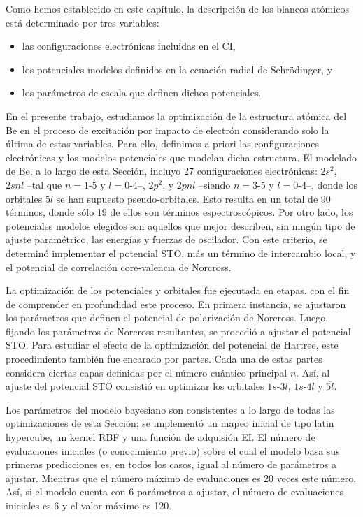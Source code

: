 Como hemos establecido en este capítulo, la descripción de los blancos 
atómicos está determinado por tres variables:
\begin{itemize}
\item las configuraciones electrónicas incluidas en el CI,
\item los potenciales modelos definidos en la ecuación radial de 
Schr\"odinger, y
\item los parámetros de escala que definen dichos potenciales.
\end{itemize}
En el presente trabajo, estudiamos la optimización de la estructura 
atómica del Be en el proceso de excitación por impacto de electrón 
considerando solo la última de estas variables. Para ello, definimos a 
priori las configuraciones electrónicas y los modelos potenciales que
modelan dicha estructura. El modelado de Be, a lo largo de esta Sección,
incluyo 27 configuraciones electrónicas: $2s^2$, $2snl$ --tal que 
$n=1$-5 y $l=0$-4--, $2p^2$, y $2pnl$ --siendo $n=3$-5 y $l=0$-4--, 
donde los orbitales $5l$ se han supuesto pseudo-orbitales. Esto resulta 
en un total de 90 términos, donde sólo 19 de ellos son términos 
espectroscópicos. Por otro lado, los potenciales modelos elegidos son 
aquellos que mejor describen, sin ningún tipo de ajuste paramétrico, las 
energías y fuerzas de oscilador. Con este criterio, se determinó 
implementar el potencial STO, más un término de intercambio local, y el 
potencial de correlación core-valencia de Norcross.

La optimización de los potenciales y orbitales fue ejecutada en etapas, 
con el fin de comprender en profundidad este proceso. En primera 
instancia, se ajustaron los parámetros que definen el potencial de 
polarización de Norcross. Luego, fijando los parámetros de Norcross 
resultantes, se procedió a ajustar el potencial STO. Para estudiar el 
efecto de la optimización del potencial de Hartree, este procedimiento 
también fue encarado por partes. Cada una de estas partes considera 
ciertas capas definidas por el número cuántico principal $n$. Así, al 
ajuste del potencial STO consistió en optimizar los orbitales $1s$-$3l$, 
$1s$-$4l$ y $\overline{5l}$.

Los parámetros del modelo bayesiano son consistentes a lo largo de todas 
las optimizaciones de esta Sección; se implementó un mapeo inicial de 
tipo latin hypercube, un kernel RBF y una función de adquisión EI. El 
número de evaluaciones iniciales (o conocimiento previo) sobre el cual el 
modelo basa sus primeras predicciones es, en todos los casos, igual al 
número de parámetros a ajustar. Mientras que el número máximo de 
evaluaciones es 20 veces este número.  Así, si el modelo cuenta con 6 
parámetros a ajustar, el número de evaluaciones iniciales es 6 y el valor
máximo es 120.


